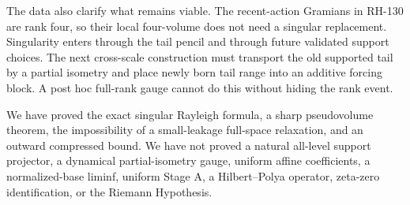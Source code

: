 \documentclass[12pt]{article}
\begin{document}
The data also clarify what remains viable.  The recent-action Gramians in
RH-130 are rank four, so their local four-volume does not need a singular
replacement.  Singularity enters through the tail pencil and through future
validated support choices.  The next cross-scale construction must transport
the old supported tail by a partial isometry and place newly born tail range
into an additive forcing block.  A post hoc full-rank gauge cannot do this
without hiding the rank event.

We have proved the exact singular Rayleigh formula, a sharp pseudovolume
theorem, the impossibility of a small-leakage full-space relaxation, and an
outward compressed bound.  We have not proved a natural all-level support
projector, a dynamical partial-isometry gauge, uniform affine coefficients,
a normalized-base liminf, uniform Stage A, a Hilbert--Polya operator,
zeta-zero identification, or the Riemann Hypothesis.



\end{document}
